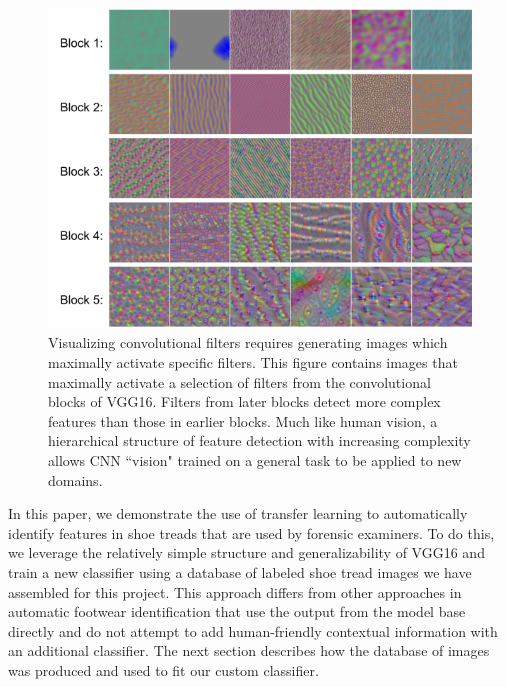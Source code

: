 \documentclass{article}\usepackage[]{graphicx}\usepackage[table]{xcolor}
\makeatletter
\def\maxwidth{ %
  \ifdim\Gin@nat@width>\linewidth
    \linewidth
  \else
    \Gin@nat@width
  \fi
}
\newenvironment{knitrout}{}{} %
\makeatother
\begin{document}
\begin{knitrout}
\color{fgcolor}\begin{figure}

{\centering \includegraphics[width=\maxwidth]{images/labeled_filters}

}

\caption[Visualizing convolutional filters requires generating images which maximally activate specific filters]{Visualizing convolutional filters requires generating images which maximally activate specific filters. This figure contains images that maximally activate a selection of filters from the convolutional blocks of VGG16. Filters from later blocks detect more complex features than those in earlier blocks. Much like human vision, a hierarchical structure of feature detection with increasing complexity allows CNN ``vision" trained on a general task to be applied to new domains.}\label{fig:vgg16layers}
\end{figure}


\end{knitrout}

In this paper, we demonstrate the use of transfer learning to automatically identify features in shoe treads that are used by forensic examiners. To do this, we leverage the relatively simple structure and generalizability of VGG16 and train a new classifier using a database of labeled shoe tread images we have assembled for this project. This approach differs from other approaches \citep{kongCrossDomainForensicShoeprint2017,kongCrossDomainImageMatching2019a,zhangAdaptingConvolutionalNeural2017} in automatic footwear identification that use the output from the model base directly and do not attempt to add human-friendly contextual information with an additional classifier. The next section describes how the database of images was produced and used to fit our custom classifier.
\end{document}
